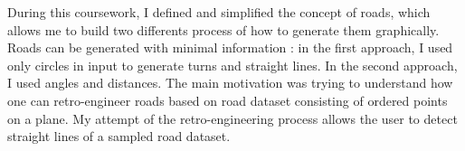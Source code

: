  During this coursework, I defined and simplified the concept of roads, which allows me to build two differents process of how to generate them graphically. Roads can be generated with minimal information : in the first approach, I used only circles in input to generate turns and straight lines. In the second approach, I used angles and distances. The main motivation was trying to understand how one can retro-engineer roads based on road dataset consisting of ordered points on a plane. My attempt of the retro-engineering process allows the user to detect straight lines of a sampled road dataset.